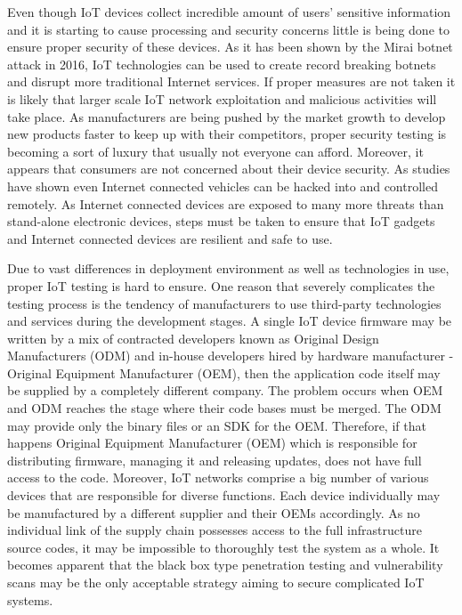 Even though IoT devices collect incredible amount of users’ sensitive information and it is starting to cause processing and security concerns \cite{7069995} little is being done to ensure proper security of these devices. As it has been shown by the Mirai botnet attack in 2016, IoT technologies can be used to create record breaking botnets and disrupt more traditional Internet services\cite{203628}. If proper measures are not taken it is likely that larger scale IoT network exploitation and malicious activities will take place. As manufacturers are being pushed by the market growth to develop new products faster to keep up with their competitors, proper security testing is becoming a sort of luxury that usually not everyone can afford. Moreover, it appears that consumers are not concerned about their device security\cite{iotm}. As studies have shown even Internet connected vehicles can be hacked into and controlled remotely\cite{8071577}. As Internet connected devices are exposed to many more threats than stand-alone electronic devices, steps must be taken to ensure that IoT gadgets and Internet connected devices are resilient and safe to use.

Due to vast differences in deployment environment as well as technologies in use, proper IoT testing is hard to ensure. One reason that severely complicates the testing process is the tendency of manufacturers to use third-party technologies and services during the development stages. A single IoT device firmware may be written by a mix of contracted developers known as Original Design Manufacturers (ODM) and in-house developers hired by hardware manufacturer - Original Equipment Manufacturer (OEM), then the application code itself may be supplied by a completely different company\cite{cookbook}. The problem occurs when OEM and ODM reaches the stage where their code bases must be merged. The ODM may provide only the binary files or an SDK for the OEM. Therefore, if that happens Original Equipment Manufacturer (OEM) which is responsible for distributing firmware, managing it and releasing updates, does not have full access to the code. Moreover, IoT networks comprise a big number of various devices that are responsible for diverse functions. Each device individually may be manufactured by a different supplier and their OEMs accordingly. As no individual link of the supply chain possesses access to the full infrastructure source codes, it may be impossible to thoroughly test the system as a whole. It becomes apparent that the black box type penetration testing and vulnerability scans may be the only acceptable strategy aiming to secure complicated IoT systems.

